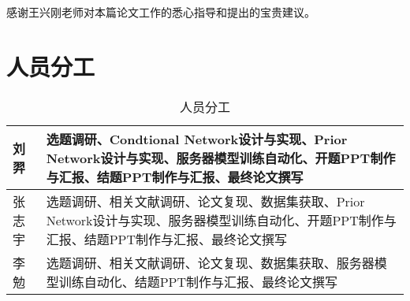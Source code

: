 \documentclass{cjc}
\begin{document}
\maketitle












% 

\begin{acknowledgments}
  感谢王兴刚老师对本篇论文工作的悉心指导和提出的宝贵建议。
\end{acknowledgments}

\appendix

\section{人员分工}
\begin{table}  
    \begin{center}  
    \begin{tabular}{|l| m{5cm}|}  
    \hline  
        刘羿 & 选题调研、Condtional Network设计与实现、Prior     Network设计与实现、服务器模型训练自动化、开题PPT制作与汇报、结题PPT制作与汇报、最终论文撰写 \\ \hline
        张志宇 & 选题调研、相关文献调研、论文复现、数据集获取、Prior     Network设计与实现、服务器模型训练自动化、开题PPT制作与汇报、结题PPT制作与汇报、最终论文撰写\\ \hline  
        李勉 & 选题调研、相关文献调研、论文复现、数据集获取、服务器模型训练自动化、结题PPT制作与汇报、最终论文撰写 \\ 
    \hline  
    \end{tabular}  
    \end{center}
    \caption{人员分工}  
\end{table}

\nocite{*}



\newpage

\makebiographies









\end{document}
